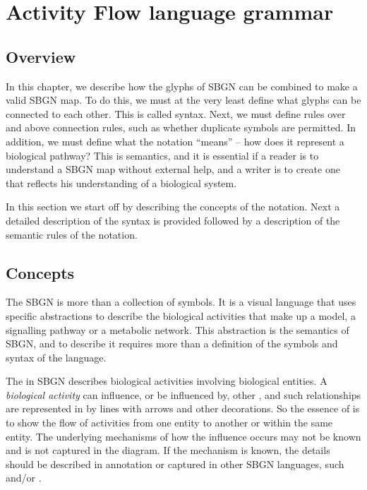 \chapter{Activity Flow language grammar}
\label{chp:af:grammar}

\section{Overview}
In this chapter, we describe how the glyphs of SBGN \AF can be combined to make a valid SBGN \AF map. To do this, we must at the very least define what glyphs can be connected to each other. This is called syntax. Next, we must define rules over and above connection rules, such as whether duplicate symbols are permitted. In addition, we must define what the notation ``means'' -- how does it represent a biological pathway? This is semantics, and it is essential if a reader is to understand a SBGN map without external help, and a writer is to create one that reflects his understanding of a biological system.

In this section we start off by describing the concepts of the \AF{} notation. Next a detailed description of the syntax is provided
followed by a description of the semantic rules of the notation.

\section{Concepts}

The SBGN \AF{} is more than a collection of symbols. It is a visual language that uses specific abstractions to describe the biological activities that make up a model, a signalling pathway or a metabolic network. This abstraction is the semantics of SBGN, and to describe it requires more than a definition of the symbols and syntax of the language. 

The \AF{} in SBGN describes biological activities involving biological entities. A \emph{biological activity} can influence, or be influenced by, other , and such relationships are represented in \AF by lines with arrows and other decorations. So the essence of \AF is to show the flow of activities from one entity to another or within the same entity. The underlying mechanisms of how the influence occurs may not be known and is not captured in the diagram. If the mechanism is known, the details should be described in annotation or captured in other SBGN languages, such \PD and/or \ER.





